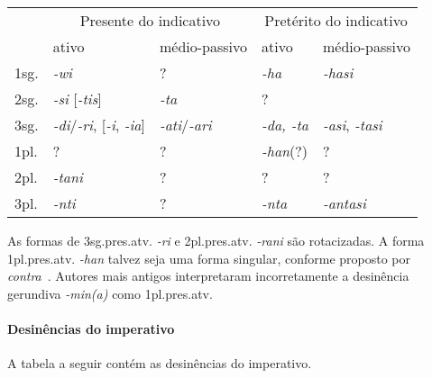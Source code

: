 \begin{center}
	\begin{tabular}[c]{lll|ll}
		\toprule
		                               & \multicolumn{2}{c|}{Presente do indicativo}           & \multicolumn{2}{c}{Pretérito do indicativo}                                     \\
		                               & ativo                                                 & médio-passivo                               & ativo            & médio-passivo  \\
		\midrule
		1sg.                           & \emph{-wi}                                            & {?}                                         & \emph{-ha}       & \emph{-hasi}   \\
		2sg.                           & \emph{-si} [\emph{-tis}]                              & \emph{-ta}                                  & {?}              &                \\
		3sg.                           & \emph{-di}\slash{}\emph{-ri}, [\emph{-i}, \emph{-ia}] &
		\emph{-ati}\slash{}\emph{-ari} & \emph{-da, -ta}                                       & \emph{-asi}, \emph{-tasi}                                                       \\
		1pl.                           & {?}                                                   & {?}                                         & \emph{-han}{(?)} & {?}            \\
		2pl.                           & \emph{-tani}                                          & {?}                                         & {?}              & {?}            \\
		3pl.                           & \emph{-nti}                                           & {?}                                         & \emph{-nta}      & \emph{-antasi} \\
		\bottomrule
	\end{tabular}
\end{center}

\noindent As formas de 3sg.pres.atv. \emph{-ri} e 2pl.pres.atv. \emph{-rani} são
rotacizadas. A forma 1pl.pres.atv. \emph{-han} talvez seja uma forma singular,
conforme proposto por~\citet{Carruba1984} \emph{contra}~\citet{MorpurgoDavies1980}.
Autores mais antigos interpretaram incorretamente a desinência
gerundiva \emph{-min{(a)}} como 1pl.pres.atv.

\paragraph{Desinências do imperativo}
A tabela a seguir contém as desinências do imperativo.

